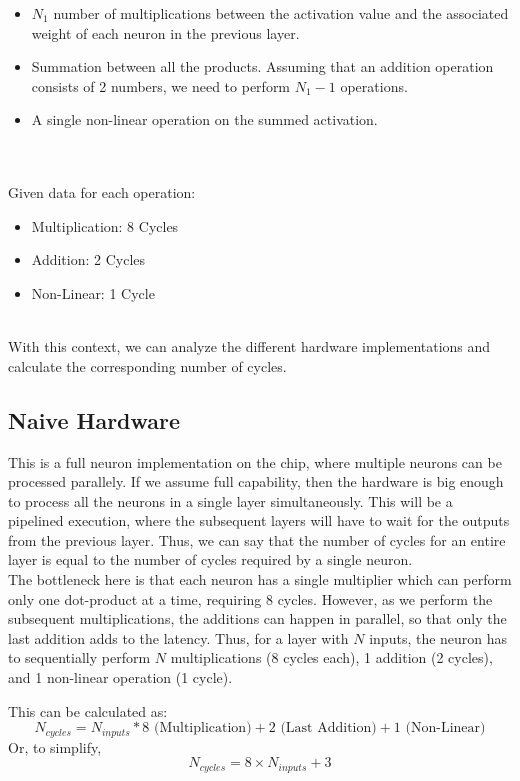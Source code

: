 \documentclass{article}
\begin{document}
\begin{itemize}
    \item $N_1$ number of multiplications between the activation value and the associated weight of each neuron in the previous layer.
    \item Summation between all the products. Assuming that an addition operation consists of 2 numbers, we need to perform $N_1 - 1$ operations.
    \item A single non-linear operation on the summed activation.
\end{itemize}\\
\\
Given data for each operation:

\begin{itemize}
    \item Multiplication: 8 Cycles
    \item Addition: 2 Cycles
    \item Non-Linear: 1 Cycle
\end{itemize}
\\
With this context, we can analyze the different hardware implementations and calculate the corresponding number of cycles.

\subsection{Naive Hardware}

This is a full neuron implementation on the chip, where multiple neurons can be processed parallely. If we assume full capability, then the hardware is big enough to process all the neurons in a single layer simultaneously. This will be a pipelined execution, where the subsequent layers will have to wait for the outputs from the previous layer. Thus, we can say that the number of cycles for an entire layer is equal to the number of cycles required by a single neuron. \\

The bottleneck here is that each neuron has a single multiplier which can perform only one dot-product at a time, requiring 8 cycles. However, as we perform the subsequent multiplications, the additions can happen in parallel, so that only the last addition adds to the latency. Thus, for a layer with $N$ inputs, the neuron has to sequentially perform $N$ multiplications (8 cycles each), 1 addition (2 cycles), and 1 non-linear operation (1 cycle).

This can be calculated as:
\begin{equation}
    N_{cycles} = N_{inputs} * 8 \text{ (Multiplication)} + 2 \text{ (Last Addition)} + 1 \text{ (Non-Linear)} 
\end{equation}
Or, to simplify,
\begin{equation}
    N_{cycles} = 8 \times N_{inputs} + 3
\end{equation}
\end{document}
